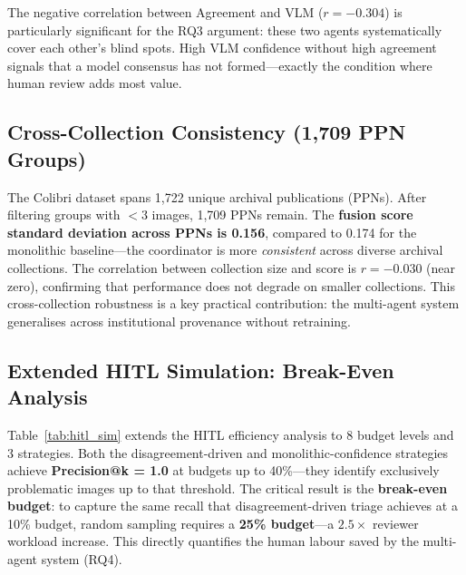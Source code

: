 \documentclass[12pt,onecolumn,a4paper]{IEEEtran}
\begin{document}
The negative correlation between Agreement and VLM ($r = -0.304$) is particularly significant for the RQ3 argument: these two agents systematically cover each other's blind spots. High VLM confidence without high agreement signals that a model consensus has not formed---exactly the condition where human review adds most value.

\subsection{Cross-Collection Consistency (1,709 PPN Groups)}
\label{sec:ppn}

The Colibri dataset spans 1,722 unique archival publications (PPNs). After filtering groups with $<$3 images, 1,709 PPNs remain. The \textbf{fusion score standard deviation across PPNs is 0.156}, compared to 0.174 for the monolithic baseline---the coordinator is more \textit{consistent} across diverse archival collections. The correlation between collection size and score is $r = -0.030$ (near zero), confirming that performance does not degrade on smaller collections. This cross-collection robustness is a key practical contribution: the multi-agent system generalises across institutional provenance without retraining.

\subsection{Extended HITL Simulation: Break-Even Analysis}
\label{sec:hitl_sim}

Table~\ref{tab:hitl_sim} extends the HITL efficiency analysis to 8 budget levels and 3 strategies. Both the disagreement-driven and monolithic-confidence strategies achieve \textbf{Precision@k = 1.0} at budgets up to 40\%---they identify exclusively problematic images up to that threshold. The critical result is the \textbf{break-even budget}: to capture the same recall that disagreement-driven triage achieves at a 10\% budget, random sampling requires a \textbf{25\% budget}---a $2.5\times$ reviewer workload increase. This directly quantifies the human labour saved by the multi-agent system (RQ4).
\end{document}
